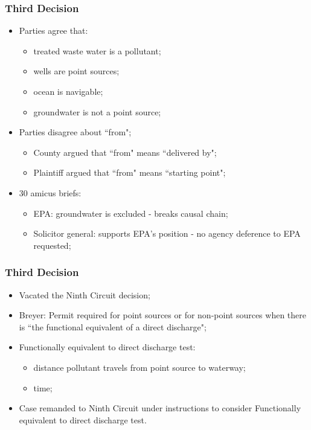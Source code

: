 \documentclass[aspectratio=169]{beamer}
\theoremstyle{principle}
\begin{document}
\begin{frame}
\frametitle{Third Decision}

\begin{itemize}
\item Parties agree that: 
\begin{itemize}
\item treated waste water is a pollutant;
\item wells are point sources;
\item ocean is navigable;
\item groundwater is not a point source;
\end{itemize}
\bigskip
\item Parties disagree about ``from";
\begin{itemize}
\item County argued that ``from" means ``delivered by";
\item Plaintiff argued that ``from" means ``starting point";
\end{itemize}
\bigskip
\item 30 amicus briefs: 
\begin{itemize}
\item EPA: groundwater is excluded - breaks causal chain;
\item Solicitor general: supports EPA’s position - no agency deference to EPA requested;
\end{itemize}
\end{itemize}
\end{frame}

\begin{frame}
\frametitle{Third Decision}

\begin{itemize}
\item Vacated the Ninth Circuit decision;
\bigskip
\item Breyer: Permit required for point sources or for non-point sources when there is ``the functional equivalent of a direct discharge";
\bigskip
\item Functionally equivalent to direct discharge test:
\begin{itemize}
\item distance pollutant travels from point source to waterway;
\item time;
\end{itemize}
\bigskip
\item Case remanded to Ninth Circuit under instructions to consider Functionally equivalent to direct discharge test.
\end{itemize}
\end{frame}
\end{document}
